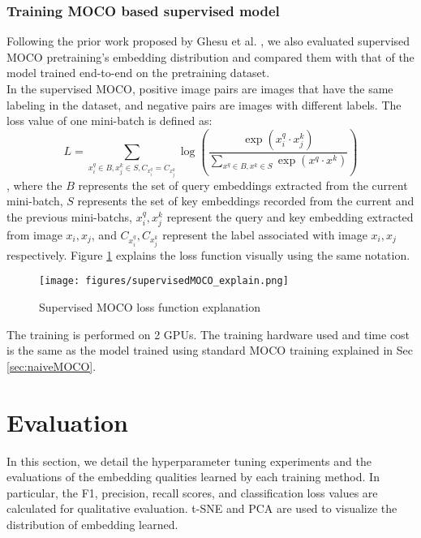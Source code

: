 \documentclass[12pt,twoside]{report}
\begin{document}
\subsection{Training MOCO based supervised model}
Following the prior work proposed by Ghesu et al. \cite{selfsupervisedlearningfrom100}, we also evaluated supervised MOCO pretraining's embedding distribution and compared them with that of the model trained end-to-end on the pretraining dataset.\\

In the supervised MOCO, positive image pairs are images that have the same labeling in the dataset, and negative pairs are images with different labels. The loss value of one mini-batch is defined as:
$$L = \sum_{x_i^q \in B, x_j^k \in S, C_{x_i^q} = C_{x_j^k}}\log(\frac{\exp(x_i^q \cdot x_j^k)}{\sum_{x^q \in B, x^k \in S}\exp(x^q \cdot x^k)})$$
, where the $B$ represents the set of query embeddings extracted from the current mini-batch, $S$ represents the set of key embeddings recorded from the current and the previous mini-batchs, $x_i^q, x_j^k$ represent the query and key embedding extracted from image $x_i, x_j$, and $C_{x_i^q}, C_{x_j^k}$ represent the label associated with image $x_i, x_j$ respectively. Figure \ref{fig:supervisedMOCO_loss_explain} explains the loss function visually using the same notation.\\

\begin{figure}
    \centering
    \texttt{[image: figures/supervisedMOCO\_explain.png]}
    \caption{Supervised MOCO loss function explanation}
    \label{fig:supervisedMOCO_loss_explain}
\end{figure}

The training is performed on 2 GPUs. The training hardware used and time cost is the same as the model trained using standard MOCO training explained in Sec \ref{sec:naiveMOCO}. 

\chapter{Evaluation}
In this section, we detail the hyperparameter tuning experiments and the evaluations of the embedding qualities learned by each training method. In particular, the F1, precision, recall scores, and classification loss values are calculated for qualitative evaluation. t-SNE and PCA are used to visualize the distribution of embedding learned. \\
\end{document}
